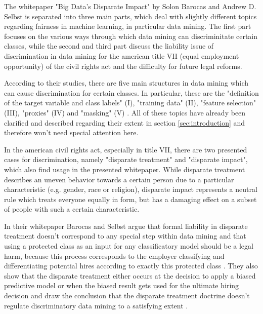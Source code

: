 The whitepaper "Big Data’s Disparate Impact" \cite{Barocas.2016} by Solon Barocas and 
Andrew D. Selbst is separated into three main parts, which deal with slightly different 
topics regarding fairness in machine learning, in particular data mining. The first part 
focuses on the various ways through which data mining can discriminitate certain classes, 
while the second and third part discuss the liability issue of discrimination in data 
mining for the american title VII (equal employment opportunity) \cite{titleVII} of the 
civil rights act and the difficulty for future legal reforms.  

According to their studies, there are five main structures in data mining which can 
cause discrimination for certain classes. In particular, these are the "definition of 
the target variable and class labels" (I), "training data" (II), "feature selection" (III), 
"proxies" (IV) and "masking" (V) \cite{Barocas.2016}. All of these topics have already 
been clarified and described regarding their extent in section \ref{sec:introduction} and 
therefore won't need special attention here.

In the american civil rights act, especially in title VII, there are two presented cases 
for discrimination, namely "disparate treatment" and "disparate impact", which also find 
usage in the presented whitepaper. While disparate treatment describes an uneven behavior 
towards a certain person due to a particular characteristic (e.g. gender, race or 
religion), disparate impact represents a neutral rule which treats everyone equally in 
form, but has a damaging effect on a subset of people with such a certain characteristic.

In their whitepaper Barocas and Selbst argue that formal liability in disparate treatment 
doesn't correspond to any special step within data mining and that using a protected 
class as an input for any classificatory model should be a legal harm, because this 
process corresponds to the employer classifying and differentiating potential hires 
according to exactly this protected class \cite{Barocas.2016}. They also show that the 
disparate treatment either occurs at the decision to apply  a biased predictive model 
or when the biased result gets used for the ultimate hiring decision and draw the 
conclusion that the disparate treatment doctrine doesn't regulate discriminatory 
data mining to a satisfying extent \cite{Barocas.2016}. 

